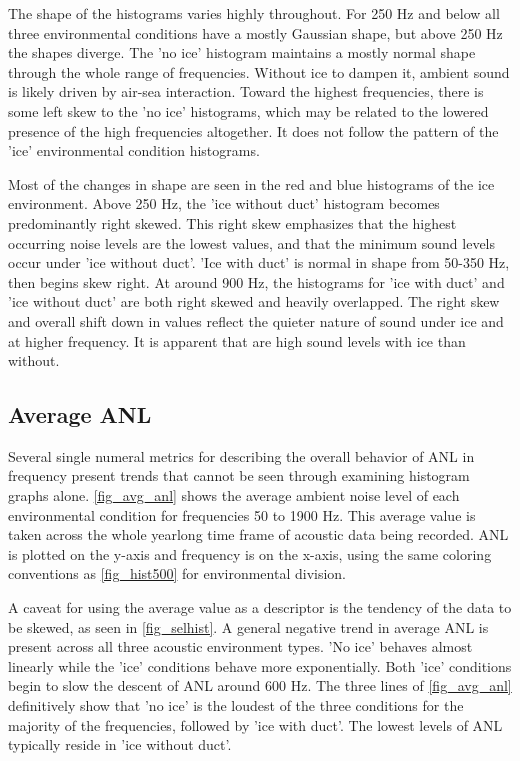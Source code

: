 The shape of the histograms varies highly throughout. For 250 Hz and below all three environmental conditions have a mostly Gaussian shape, but above 250 Hz the shapes diverge. The 'no ice' histogram maintains a mostly normal shape through the whole range of frequencies. Without ice to dampen it, ambient sound is likely driven by air-sea interaction. Toward the highest frequencies, there is some left skew to the 'no ice' histograms, which may be related to the lowered presence of the high frequencies altogether. It does not follow the pattern of the 'ice' environmental condition histograms.

Most of the changes in shape are seen in the red and blue histograms of the ice environment. Above 250 Hz, the 'ice without duct' histogram becomes predominantly right skewed. This right skew emphasizes that the highest occurring noise levels are the lowest values, and that the minimum sound levels occur under 'ice without duct'. 'Ice with duct' is normal in shape from 50-350 Hz, then begins skew right. At around 900 Hz, the histograms for 'ice with duct' and 'ice without duct' are both right skewed and heavily overlapped. The right skew and overall shift down in values reflect the quieter nature of sound under ice and at higher frequency. It is apparent that are high sound levels with ice than without.




\subsection{Average ANL} \label{sec_avg_anl}
Several single numeral metrics for describing the overall behavior of ANL in frequency present trends that cannot be seen through examining histogram graphs alone. \autoref{fig_avg_anl} shows the average ambient noise level of each environmental condition for frequencies 50 to 1900 Hz. This average value is taken across the whole yearlong time frame of acoustic data being recorded. ANL is plotted on the y-axis and frequency is on the x-axis, using the same coloring conventions as \autoref{fig_hist500} for environmental division.

A caveat for using the average value as a descriptor is the tendency of the data to be skewed, as seen in \autoref{fig_selhist}. A general negative trend in average ANL is present across all three acoustic environment types. 'No ice' behaves almost linearly while the 'ice' conditions behave more exponentially. Both 'ice' conditions begin to slow the descent of ANL around 600 Hz. The three lines of \autoref{fig_avg_anl} definitively show that 'no ice' is the loudest of the three conditions for the majority of the frequencies, followed by 'ice with duct'. The lowest levels of ANL typically reside in 'ice without duct'.


